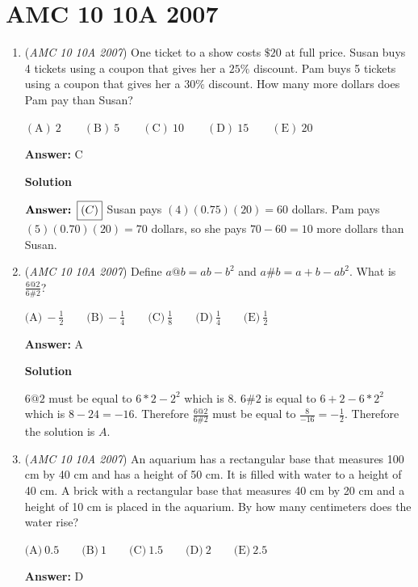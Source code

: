 \section{AMC 10 10A 2007}
        \begin{enumerate}
        	\item (\textit{AMC 10 10A 2007}) One ticket to a show costs $\$20$ at full price. Susan buys 4 tickets using a coupon that gives her a $25\%$ discount. Pam buys 5 tickets using a coupon that gives her a $30\%$ discount. How many more dollars does Pam pay than Susan?


 $\mathrm{(A)}\ 2\qquad \mathrm{(B)}\ 5\qquad \mathrm{(C)}\ 10\qquad \mathrm{(D)}\ 15\qquad \mathrm{(E)}\ 20$

 \textbf{Answer: }C



\textbf{Solution}

$\textbf{Answer: \boxed{(C)}}$ Susan pays $(4)(0.75)(20) = 60$ dollars. Pam pays $(5)(0.70)(20) = 70$ dollars, so she pays $70-60=10$ more dollars than Susan.

 


	\item (\textit{AMC 10 10A 2007}) Define $a@b = ab - b^{2}$ and $a\#b = a + b - ab^{2}$. What is $\frac {6@2}{6\#2}$?


 $\text{(A)}\ - \frac {1}{2}\qquad \text{(B)}\ - \frac {1}{4}\qquad \text{(C)}\ \frac {1}{8}\qquad \text{(D)}\ \frac {1}{4}\qquad \text{(E)}\ \frac {1}{2}$

 \textbf{Answer: }A



\textbf{Solution}

$6@2$ must be equal to $6*2-2^2$ which is 8. $6\# 2$ is equal to $6+2-6*2^2$ which is $8-24 = -16$. Therefore $\frac{6@2}{6\# 2}$ must be equal to $\frac{8}{-16} = -\frac{1}{2}$. Therefore the solution is $\boxed{A}$.

 


	\item (\textit{AMC 10 10A 2007}) An aquarium has a rectangular base that measures 100 cm by 40 cm and has a height of 50 cm. It is filled with water to a height of 40 cm. A brick with a rectangular base that measures 40 cm by 20 cm and a height of 10 cm is placed in the aquarium. By how many centimeters does the water rise? 


 $\text{(A)}\ 0.5 \qquad \text{(B)}\ 1 \qquad \text{(C)}\ 1.5 \qquad \text{(D)}\ 2 \qquad \text{(E)}\ 2.5$

 \textbf{Answer: }D




\end{enumerate}
